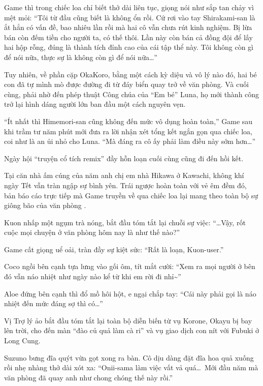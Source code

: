 \documentclass[../main.tex]{subfiles}
\begin{document}
Game thì trong chiếc loa chỉ biết thở dài liên tục, giọng nói như sắp tan chảy vì mệt mỏi: ``Tôi từ đầu cũng biết là không ổn rồi. Cứ rơi vào tay Shirakami-san là ắt hẳn có vấn đề, bao nhiêu lần rồi mà hai cô vẫn chưa rút kinh nghiệm. Bị lừa bán còn đếm tiền cho người ta, có thế thôi. Lần này còn bán cả đồng đội để lấy hai hộp rỗng, đúng là thành tích đỉnh cao của cái tập thể này. Tôi không còn gì để nói nữa, thực sự là không còn gì để nói nữa\dots''

Tuy nhiên, về phần cặp OkaKoro, bằng một cách kỳ diệu và vô lý nào đó, hai bé con đã tự mình mò được đường đi từ đáy biển quay trở về văn phòng. Và cuối cùng, phải nhờ đến phép thuật Công chúa của ``Em bé'' Luna, họ mới thành công trở lại hình dáng người lớn ban đầu một cách nguyên vẹn.

``Ít nhất thì Himemori-san cũng không đến mức vô dụng hoàn toàn,'' Game sau khi trầm tư năm phút mới đưa ra lời nhận xét tổng kết ngắn gọn qua chiếc loa, coi như là an ủi nhỏ cho Luna. ``Mà đáng ra cô ấy phải làm điều này sớm hơn\dots''

Ngày hội ``truyện cổ tích remix'' đầy hỗn loạn cuối cùng cũng đi đến hồi kết.

\omk

Tại căn nhà ấm cúng của năm anh chị em nhà Hikawa ở Kawachi, không khí ngày Tết vẫn tràn ngập sự bình yên. Trái ngược hoàn toàn với vẻ êm đềm đó, bản báo cáo trực tiếp mà Game truyền về qua chiếc loa lại mang theo toàn bộ sự giông bão của văn phòng \hll.

Kuon nhấp một ngụm trà nóng, bắt đầu tóm tắt lại chuỗi sự việc: ``\dots Vậy, rốt cuộc mọi chuyện ở văn phòng hôm nay là như thế nào?''

Game cất giọng uể oải, tràn đầy sự kiệt sức: ``Rất là loạn, Kuon-user.''

Coco ngồi bên cạnh tựa lưng vào gối ôm, tít mắt cười: ``Xem ra mọi người ở bên đó vẫn náo nhiệt như ngày nào kể từ khi em rời đi nhỉ\~{}''

Aloe đứng bên cạnh thì đổ mồ hôi hột, e ngại chắp tay: ``Cái này phải gọi là náo nhiệt đến mức đáng sợ thì có\dots''

Vị Trợ lý ảo bắt đầu tóm tắt lại toàn bộ diễn biến từ vụ Korone, Okayu bị bay lên trời, cho đến màn ``đào củ quả làm cà ri'' và vụ giao dịch con nít với Fubuki ở Long Cung.

Suzuno bưng đĩa quýt vừa gọt xong ra bàn. Cô dịu dàng đặt đĩa hoa quả xuống rồi nhẹ nhàng thở dài xót xa: ``Onii-sama làm việc vất vả quá\dots\ Mới đầu năm mà văn phòng đã quay anh như chong chóng thế này rồi.''
\end{document}
